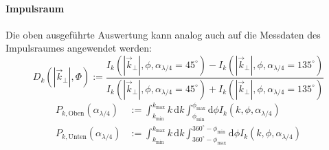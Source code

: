 \documentclass[titlepage,  ngerman]{article}
\begin{document}
		\paragraph{Impulsraum}
		Die oben ausgeführte Auswertung kann analog auch auf die Messdaten des Impulsraumes angewendet werden:
		\begin{equation}
			\label{eq:diff_measure_momentum}
			D_k\left(|\vec{k}_\perp|, \Phi\right) := \dfrac{I_k(|\vec{k}_\perp|, \phi, \alpha_{\lambda /4} = 45^\circ) - I_k(|\vec{k}_\perp|, \phi, \alpha_{\lambda /4} = 135^\circ)}{I_k(|\vec{k}_\perp|, \phi, \alpha_{\lambda /4} = 45^\circ) + I_k(|\vec{k}_\perp|, \phi, \alpha_{\lambda /4} = 135^\circ)}
		\end{equation} 
		\begin{align}
			P_{k, \mathrm{Oben}}(\alpha_{\lambda/4}) &:= \int_{k_\mathrm{min}}^{k_\mathrm{max}}k \, \mathrm{d}k \int_{\phi_\mathrm{min}}^{\phi_\mathrm{max}} \mathrm{d}\phi I_k(k, \phi, \alpha_{\lambda /4}) \\
			\nonumber
			P_{k, \mathrm{Unten}}(\alpha_{\lambda/4}) &:= \int_{k_\mathrm{min}}^{k_\mathrm{max}}k \, \mathrm{d}k \int_{360^\circ -\phi_\mathrm{max}}^{360^\circ - \phi_\mathrm{min}} \mathrm{d}\phi I_k(k, \phi, \alpha_{\lambda/4})		 	
		\end{align}
		
\end{document}
